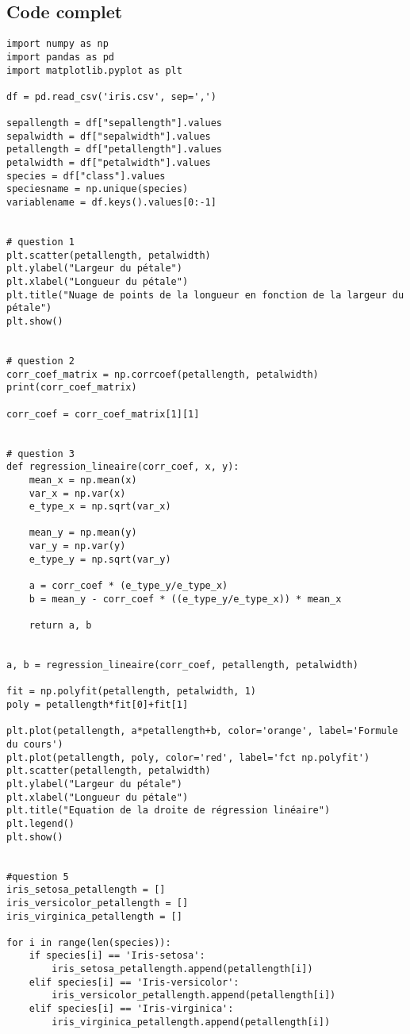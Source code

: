\subsection{Code complet}
\begin{lstlisting}[style=myPython, caption=Code Python complet TP2, frame=lines]
import numpy as np
import pandas as pd
import matplotlib.pyplot as plt

df = pd.read_csv('iris.csv', sep=',')

sepallength = df["sepallength"].values
sepalwidth = df["sepalwidth"].values
petallength = df["petallength"].values
petalwidth = df["petalwidth"].values
species = df["class"].values
speciesname = np.unique(species)
variablename = df.keys().values[0:-1]


# question 1
plt.scatter(petallength, petalwidth)
plt.ylabel("Largeur du pétale")
plt.xlabel("Longueur du pétale")
plt.title("Nuage de points de la longueur en fonction de la largeur du pétale")
plt.show()


# question 2
corr_coef_matrix = np.corrcoef(petallength, petalwidth)
print(corr_coef_matrix)

corr_coef = corr_coef_matrix[1][1]


# question 3
def regression_lineaire(corr_coef, x, y):
    mean_x = np.mean(x)
    var_x = np.var(x)
    e_type_x = np.sqrt(var_x)

    mean_y = np.mean(y)
    var_y = np.var(y)
    e_type_y = np.sqrt(var_y)

    a = corr_coef * (e_type_y/e_type_x)
    b = mean_y - corr_coef * ((e_type_y/e_type_x)) * mean_x

    return a, b


a, b = regression_lineaire(corr_coef, petallength, petalwidth)

fit = np.polyfit(petallength, petalwidth, 1)
poly = petallength*fit[0]+fit[1]

plt.plot(petallength, a*petallength+b, color='orange', label='Formule du cours')
plt.plot(petallength, poly, color='red', label='fct np.polyfit')
plt.scatter(petallength, petalwidth)
plt.ylabel("Largeur du pétale")
plt.xlabel("Longueur du pétale")
plt.title("Equation de la droite de régression linéaire")
plt.legend()
plt.show()


#question 5
iris_setosa_petallength = []
iris_versicolor_petallength = []
iris_virginica_petallength = []

for i in range(len(species)):
    if species[i] == 'Iris-setosa':
        iris_setosa_petallength.append(petallength[i])
    elif species[i] == 'Iris-versicolor':
        iris_versicolor_petallength.append(petallength[i])
    elif species[i] == 'Iris-virginica':
        iris_virginica_petallength.append(petallength[i])


\end{lstlisting}
